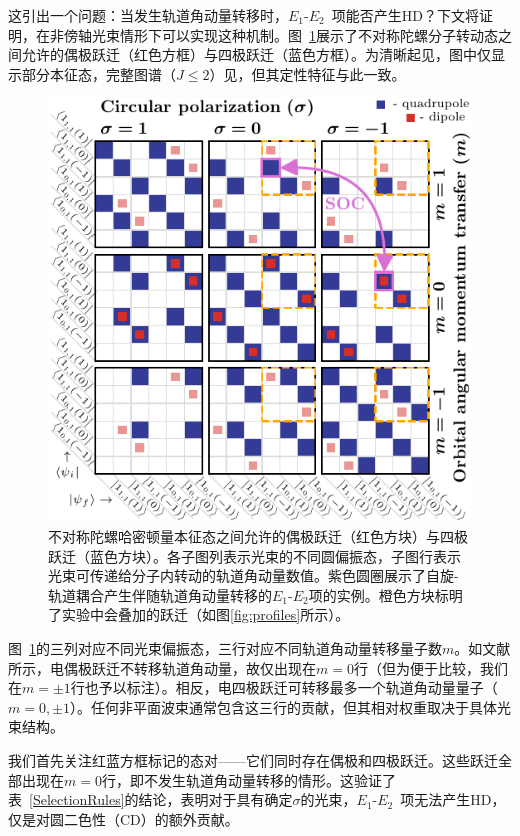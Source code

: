 \documentclass[reprint,aps,prl,twocolumn,superscriptaddress,groupedaddress]{revtex4-2}
\newcommand{\eoet}{$E_1$-$E_2$}
\begin{document}
\begin{CJK*}{UTF8}{gbsn}
这引出一个问题：当发生轨道角动量转移时，\eoet~项能否产生HD？下文将证明，在非傍轴光束情形下可以实现这种机制。图~\ref{fig:gridJ1}展示了不对称陀螺分子转动态之间允许的偶极跃迁（红色方框）与四极跃迁（蓝色方框）。为清晰起见，图中仅显示部分本征态，完整图谱（$J\leq 2$）见\cite{Note1}，但其定性特征与此一致。

\begin{figure}[ht!]
    \centering
    \includegraphics[width=\linewidth]{Figure1.pdf}
    \caption{不对称陀螺哈密顿量本征态之间允许的偶极跃迁（红色方块）与四极跃迁（蓝色方块）。各子图列表示光束的不同圆偏振态，子图行表示光束可传递给分子内转动的轨道角动量数值。紫色圆圈展示了自旋-轨道耦合产生伴随轨道角动量转移的\eoet 项的实例。橙色方块标明了实验中会叠加的跃迁（如图\ref{fig:profiles}所示）。}
    \label{fig:gridJ1}
\end{figure}
图~\ref{fig:gridJ1}的三列对应不同光束偏振态，三行对应不同轨道角动量转移量子数$m$。如文献\cite{Maslov2024,Maslov_Thesis}所示，电偶极跃迁不转移轨道角动量，故仅出现在$m=0$行（但为便于比较，我们在$m=\pm 1$行也予以标注）。相反，电四极跃迁可转移最多一个轨道角动量量子（$m=0,\pm 1$）。任何非平面波束通常包含这三行的贡献，但其相对权重取决于具体光束结构。

我们首先关注红蓝方框标记的态对——它们同时存在偶极和四极跃迁。这些跃迁全部出现在$m=0$行，即不发生轨道角动量转移的情形。这验证了表~\ref{SelectionRules}的结论，表明对于具有确定$\sigma$的光束，\eoet~项无法产生HD，仅是对圆二色性（CD）的额外贡献。


\end{CJK*}
\end{document}
